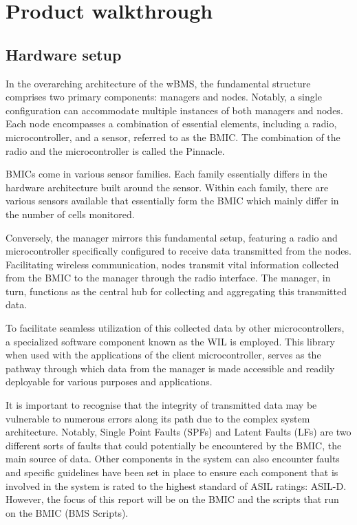 \chapter{Product walkthrough} %

\label{ch:walkthrough}


\section{Hardware setup}

In the overarching architecture of the wBMS, the fundamental structure comprises two primary components: managers and nodes. Notably, a single configuration can accommodate multiple instances of both managers and nodes. Each node encompasses a combination of essential elements, including a radio, microcontroller, and a sensor, referred to as the BMIC. The combination of the radio and the microcontroller is called the Pinnacle.

BMICs come in various sensor families. Each family essentially differs in the hardware architecture built around the sensor. Within each family, there are various sensors available that essentially form the BMIC which mainly differ in the number of cells monitored.

Conversely, the manager mirrors this fundamental setup, featuring a radio and microcontroller specifically configured to receive data transmitted from the nodes. Facilitating wireless communication, nodes transmit vital information collected from the BMIC to the manager through the radio interface. The manager, in turn, functions as the central hub for collecting and aggregating this transmitted data.

To facilitate seamless utilization of this collected data by other microcontrollers, a specialized software component known as the WIL is employed. This library when used with the applications of the client microcontroller, serves as the pathway through which data from the manager is made accessible and readily deployable for various purposes and applications.

It is important to recognise that the integrity of transmitted data may be vulnerable to numerous errors along its path due to the complex system architecture. Notably, Single Point Faults (SPFs) and Latent Faults (LFs) are two different sorts of faults that could potentially be encountered by the BMIC, the main source of data. Other components in the system can also encounter faults and specific guidelines have been set in place to ensure each component that is involved in the system is rated to the highest standard of ASIL ratings: ASIL-D. However, the focus of this report will be on the BMIC and the scripts that run on the BMIC (BMS Scripts).

